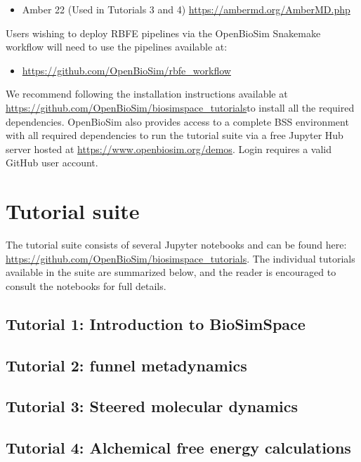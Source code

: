 \documentclass[9pt,tutorial,pubversion]{livecoms}
\newcommand{\githubrepository}{\url{https://github.com/OpenBioSim/biosimspace_tutorials}}  %
\begin{document}
\begin{itemize}
    \item Amber 22 (Used in Tutorials 3 and 4) \url{https://ambermd.org/AmberMD.php}
\end{itemize}

Users wishing to deploy RBFE pipelines via the OpenBioSim Snakemake workflow will need to use the pipelines available at:
\begin{itemize}
    \item \url{https://github.com/OpenBioSim/rbfe_workflow}
\end{itemize}

We recommend following the installation instructions available at \githubrepository to install all the required dependencies.
OpenBioSim also provides access to a complete BSS environment with all required dependencies to run the tutorial suite via a free Jupyter Hub server hosted at \url{https://www.openbiosim.org/demos}. Login requires a valid GitHub user account. 

\section{Tutorial suite}

The tutorial suite consists of several Jupyter notebooks and can be found here: \url{https://github.com/OpenBioSim/biosimspace_tutorials}. The individual tutorials available in the suite are summarized below, and the reader is encouraged to consult the notebooks for full details.

\subsection{Tutorial 1: Introduction to BioSimSpace}


\subsection{Tutorial 2: funnel metadynamics}


\subsection{Tutorial 3: Steered molecular dynamics}


\subsection{Tutorial 4: Alchemical free energy calculations}

\end{document}
